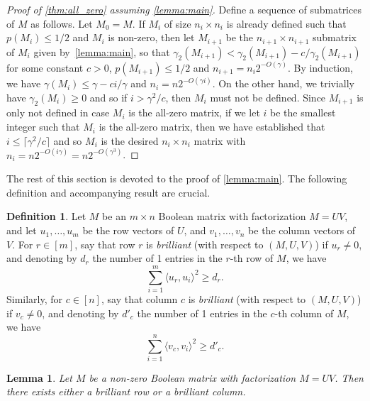 \documentclass[11pt]{amsart}
\theoremstyle{plain}
\newtheorem{lemma}[theorem]{Lemma}
\theoremstyle{definition}
\newtheorem{definition}{Definition}
\begin{document}
\begin{proof}[Proof of \cref{thm:all_zero} assuming \cref{lemma:main}]
 Define a sequence of submatrices of $M$ as follows. Let $M_0=M$. If $M_i$ of size $n_i\times n_i$ is already defined such that $p(M_i)\leq 1/2$ and $M_i$ is non-zero, then let $M_{i+1}$ be the $n_{i+1}\times n_{i+1}$ submatrix of $M_i$ given by~\cref{lemma:main}, so that $\gamma_2(M_{i+1})<\gamma_2(M_{i+1})- c / \gamma_2(M_{i+1})$ for some constant $c > 0$, $p(M_{i+1})\leq 1/2$ and $n _{i+1}=n_i2^{-O(\gamma)}$. By induction, we have $\gamma(M_{i})\leq \gamma- c i /\gamma$ and $n_{i}=n2^{-O(\gamma i)}$. On the other hand, we trivially have $\gamma_2(M_i) \geq 0$ and so if $i > \gamma^2 / c$, then $M_i$ must not be defined. Since $M_{i+1}$ is only not defined in case $M_{i}$ is the all-zero matrix, if we let $i$ be the smallest integer such that $M_i$ is the all-zero matrix, then we have established that $i \leq \lceil \gamma^2 / c \rceil$ and so $M_i$ is the desired $n_i \times n_i$ matrix with $n_i = n 2^{-O(i \gamma)} = n2^{-O(\gamma^3)}$.
\end{proof}

The rest of this section is devoted to the proof of \cref{lemma:main}. The following definition and accompanying result are crucial.

\begin{definition}
    Let $M$ be an $m\times n$ Boolean matrix with factorization $M=UV$, and let $u_1,\dots,u_m$ be the row vectors of $U$, and $v_1,\dots,v_n$ be the column vectors of $V$. For $r\in [m]$, say that row $r$ is \emph{brilliant} (with respect to $(M,U,V)$) if $u_r\neq 0$, and denoting by $d_r$ the number of 1 entries in the $r$-th row of $M$, we have
    $$\sum_{i=1}^{m}\langle u_r,u_i\rangle^2\geq d_r.$$
    Similarly, for $c\in [n]$, say that column $c$ is  \emph{brilliant} (with respect to $(M,U,V)$) if $v_c\neq 0$, and denoting by $d'_c$ the number of 1 entries in the $c$-th column of $M$, we have
    $$\sum_{i=1}^{n}\langle v_c,v_i\rangle^2\geq d'_c.$$
\end{definition}

\begin{lemma}\label{lemma:brilliant}
Let $M$ be a non-zero Boolean matrix with factorization $M=UV$. Then there exists either a brilliant row or a brilliant column.
\end{lemma}
\end{document}

